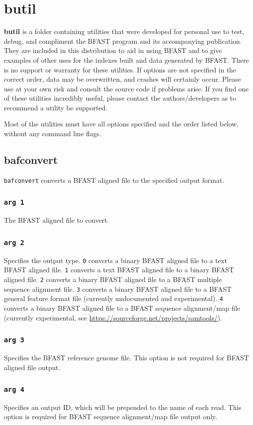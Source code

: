 \documentclass[a4paper,12pt]{book}
\newcommand{\TT}[1]{{\tt #1}} %
\newcommand{\BF}[1]{{\bf #1}} %
\newcommand{\BRGF}{BFAST reference genome file} %
\newcommand{\BAF}{BFAST aligned file} %
\newcommand{\BMAF}{BFAST multiple sequence alignment file} %
\newcommand{\BGFFF}{BFAST general feature format file} %
\newcommand{\BSAMF}{BFAST sequence alignment/map file} %
\begin{document}
\section{butil}
\label{sec:butil}
\BF{butil} is a folder containing utilities that were developed for personal use to test, debug, and compliment the BFAST program and its accompanying publication.  
They are included in this distribution to aid in using BFAST and to give examples of other uses for the indexes built and data generated by BFAST.
There is no support or warranty for these utilities.  
If options are not specified in the correct order, data may be overwritten, and crashes will certainly occur.  
Please use at your own risk and consult the source code if problems arise.  
If you find one of these utilities incredibly useful, please contact the authors/developers as to recommend a utility be supported.

Most of the utilities must have all options specified and the order listed below, without any command line flags. 

\subsection{bafconvert}
\label{sec:bafconvert}
\TT{bafconvert} converts a \BAF{} to the specified output format.
\subsubsection{\TT{arg 1}}
The \BAF{} to convert.
\subsubsection{\TT{arg 2}}
Specifies the output type.
\TT{0} converts a binary \BAF{} to a text \BAF{}.
\TT{1} converts a text \BAF{} to a binary \BAF{}.
\TT{2} converts a binary \BAF{} to a \BMAF{}.
\TT{3} converts a binary \BAF{} to a \BGFFF{} (currently undocumented and experimental).
\TT{4} converts a binary \BAF{} to a \BSAMF{} (currently experimental, see \url{https://sourceforge.net/projects/samtools/}).
\subsubsection{\TT{arg 3}}
Specifies the \BRGF{}.
This option is not required for \BAF{} output.
\subsubsection{\TT{arg 4}}
Specifies an output ID, which will be prepended to the name of each read.
This option is required for \BSAMF{} output only.
\end{document}
